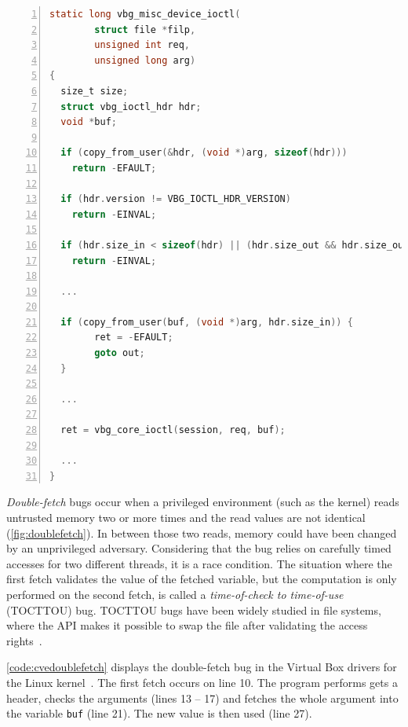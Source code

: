 \documentclass[conference]{IEEEtran}
\begin{document}
\begin{minipage}{\linewidth}
  

\begin{lstlisting}[language=C, caption=Abridged CVE-2018-12633 Double Fetch in Linux,
                  label=code:cvedoublefetch,  breaklines=true
                  postbreak=\mbox{\textcolor{red}{$\hookrightarrow$}\space},
                  numbers=left,basicstyle=\scriptsize, xleftmargin=5.0ex]
static long vbg_misc_device_ioctl(
        struct file *filp,
        unsigned int req,
        unsigned long arg)
{
  size_t size;
  struct vbg_ioctl_hdr hdr;
  void *buf;

  if (copy_from_user(&hdr, (void *)arg, sizeof(hdr))) 
    return -EFAULT;
  
  if (hdr.version != VBG_IOCTL_HDR_VERSION) 
    return -EINVAL;
   
  if (hdr.size_in < sizeof(hdr) || (hdr.size_out && hdr.size_out < sizeof(hdr)))
    return -EINVAL;
  
  ...
  
  if (copy_from_user(buf, (void *)arg, hdr.size_in)) {
		ret = -EFAULT;
		goto out;
  }

  ...

  ret = vbg_core_ioctl(session, req, buf);

  ...
}
\end{lstlisting}
\end{minipage}
\emph{Double-fetch} bugs occur when a privileged environment (such as the
kernel) reads untrusted memory two or more times and the read values are not
identical (\autoref{fig:doublefetch}). In between those two reads, memory could
have been changed by an unprivileged adversary. Considering that the bug relies
on carefully timed accesses for two different threads, it is a race
condition. The situation where the first fetch validates the value of the
fetched variable, but the computation is only performed on the second fetch, is
called a \emph{time-of-check to time-of-use} (TOCTTOU) bug. TOCTTOU bugs have
been widely studied in file systems, where the API makes it possible to swap the
file after validating the access rights~\cite{payer2012protecting,
pu2006methodical, wei2010modeling, tsafrir2008portably}.

\autoref{code:cvedoublefetch} displays the double-fetch bug in the Virtual Box
drivers for the Linux kernel~\cite{cve201812633}. The first fetch occurs on line
10. The program performs gets a header, checks the arguments (lines 13 -- 17)
and fetches the whole argument into the variable \texttt{buf} (line 21). The new
value is then used (line 27).
\end{document}
